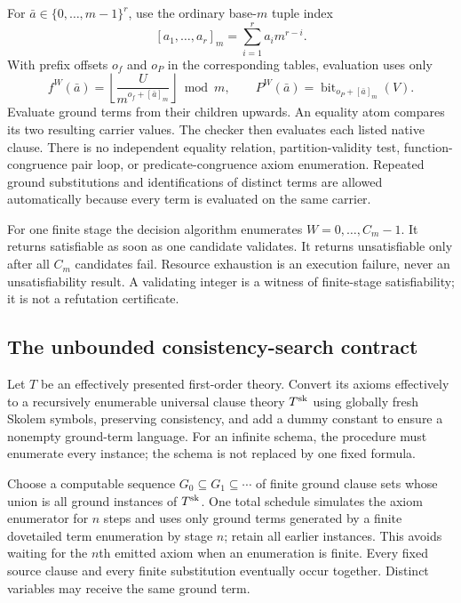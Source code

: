 For $\bar a\in\{0,\ldots,m-1\}^r$, use the ordinary base-$m$ tuple index
\[
 [a_1,\ldots,a_r]_m=\sum_{i=1}^r a_i m^{r-i}.
\]
With prefix offsets $o_f$ and $o_P$ in the corresponding tables, evaluation
uses only
\[
 f^W(\bar a)=
  \left\lfloor\frac{U}{m^{o_f+[\bar a]_m}}\right\rfloor\bmod m,
 \qquad
 P^W(\bar a)=\operatorname{bit}_{o_P+[\bar a]_m}(V).
\]
Evaluate ground terms from their children upwards.  An equality atom compares
its two resulting carrier values.  The checker then evaluates each listed
native clause.  There is no independent equality relation, partition-validity
test, function-congruence pair loop, or predicate-congruence axiom enumeration.
Repeated ground substitutions and identifications of distinct terms are
allowed automatically because every term is evaluated on the same carrier.

For one finite stage the decision algorithm enumerates $W=0,\ldots,C_m-1$.
It returns satisfiable as soon as one candidate validates.  It returns
unsatisfiable only after all $C_m$ candidates fail.  Resource exhaustion is
an execution failure, never an unsatisfiability result.  A validating integer
is a witness of finite-stage satisfiability; it is not a refutation certificate.

\subsection{The unbounded consistency-search contract}

Let $T$ be an effectively presented first-order theory.  Convert its axioms
effectively to a recursively enumerable universal clause theory $T^{\rm sk}$
using globally fresh Skolem symbols, preserving consistency, and add a dummy
constant to ensure a nonempty ground-term language.  For an infinite schema,
the procedure must enumerate every instance; the schema is not replaced by
one fixed formula.

Choose a computable sequence $G_0\subseteq G_1\subseteq\cdots$ of finite
ground clause sets whose union is all ground instances of $T^{\rm sk}$.
One total schedule simulates the axiom enumerator for $n$ steps and uses only
ground terms generated by a finite dovetailed term enumeration by stage $n$;
retain all earlier instances.  This avoids waiting for the $n$th emitted
axiom when an enumeration is finite.  Every fixed source clause and every
finite substitution eventually occur together.  Distinct variables may
receive the same ground term.

